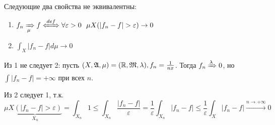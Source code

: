 \begin{remark}
    Следующие два свойства не эквивалентны:
    \begin{enumerate}
        \item \(f_n \xRightarrow[\mu]{} f \xLeftrightarrow{def} \forall \varepsilon > 0 \ \ \mu X(|f_n - f| > \varepsilon) \to 0\)
        \item \(\int_X |f_n - f| d\mu \to 0\)
    \end{enumerate}

    Из 1 не следует 2: пусть \((X, \mathfrak{A}, \mu) = (\mathbb{R}, \mathfrak{M}, \lambda), f_n = \frac{1}{nx}\). Тогда \(f_n \xRightarrow{\lambda} 0\), но \(\int |f_n - f| = +\infty\) при всех \(n\).

    Из 2 следует 1, т.к.
    \[\mu \underbrace{X(|f_n - f|> \varepsilon)}_{X_n} = \int_{X_n} 1 \leq \int_{X_n} \frac{|f_n - f|}{\varepsilon} = \frac{1}{\varepsilon} \int_{X_n} |f_n - f| \leq \frac{1}{\varepsilon} \int_X |f_n - f| \xrightarrow{n \to +\infty} 0\]
\end{remark}

